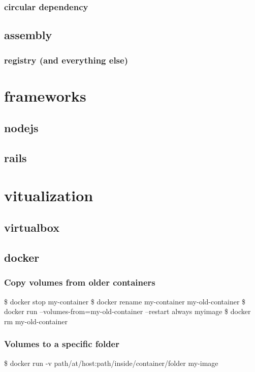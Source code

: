 \documentclass{report}
\begin{document}
\subsection{circular dependency}

\section{assembly}
\subsection{registry (and everything else)}


\chapter{frameworks}
\section{nodejs}
\section{rails}

\chapter{vitualization}
\section{virtualbox}
\section{docker}
\subsection{Copy volumes from older containers}
\begin{displayquote}
\$ docker stop my-container \newline
\$ docker rename my-container my-old-container \newline
\$ docker run --volumes-from=my-old-container --restart always myimage \newline
\$ docker rm my-old-container
\end{displayquote}
\subsection{Volumes to a specific folder}
\begin{displayquote}
\$ docker run -v path/at/host:path/inside/container/folder my-image \newline
\end{displayquote}
\end{document}
